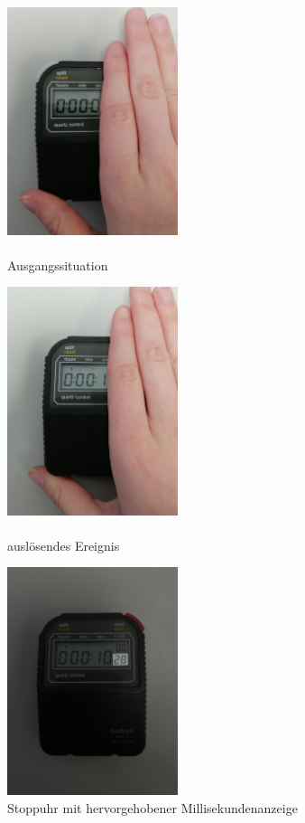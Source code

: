 \documentclass[a4paper,12pt]{article}
\begin{document}
\begin{multicols}{3}
    \begin{figure}[H]
        \centering
        \includegraphics[width=5cm]{bilder/Zusatzversuch_1_export.jpg}
        \caption{\\Ausgangssituation}
        \label{Abb:ZusatzversuchBild1}
    \end{figure}
    \columnbreak
    \begin{figure}[H]
        \centering
        \includegraphics[width=5cm]{bilder/Zusatzversuch_2_export.jpg}
        \caption{\\auslösendes Ereignis}
        \label{Abb:ZusatzversuchBild2}
    \end{figure}
    \columnbreak
    \begin{figure}[H]
        \centering
        \includegraphics[width=5cm]{bilder/Zusatzversuch_3_export.jpg}
        \caption{Stoppuhr mit hervorgehobener Millisekundenanzeige}
        \label{Abb:ZusatzversuchBild3}
    \end{figure}
    \columnbreak
\end{multicols}
\end{document}
